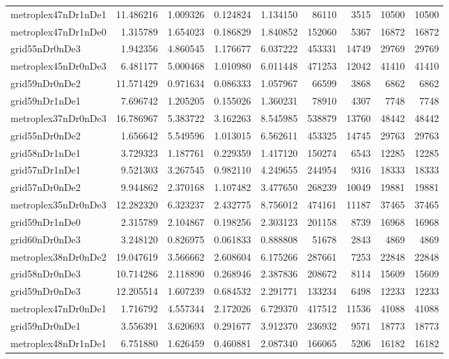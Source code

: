 \begin{longtable}{|l|r|r|r|r|r|r|r|r|}
metroplex47nDr1nDe1 & 11.486216 & 1.009326 & 0.124824 & 1.134150 & 86110 & 3515 & 10500 & 10500 \\
metroplex47nDr1nDe0 & 1.315789 & 1.654023 & 0.186829 & 1.840852 & 152060 & 5367 & 16872 & 16872 \\
grid55nDr0nDe3 & 1.942356 & 4.860545 & 1.176677 & 6.037222 & 453331 & 14749 & 29769 & 29769 \\
metroplex45nDr0nDe3 & 6.481177 & 5.000468 & 1.010980 & 6.011448 & 471253 & 12042 & 41410 & 41410 \\
grid59nDr0nDe2 & 11.571429 & 0.971634 & 0.086333 & 1.057967 & 66599 & 3868 & 6862 & 6862 \\
grid59nDr1nDe1 & 7.696742 & 1.205205 & 0.155026 & 1.360231 & 78910 & 4307 & 7748 & 7748 \\
metroplex37nDr0nDe3 & 16.786967 & 5.383722 & 3.162263 & 8.545985 & 538879 & 13760 & 48442 & 48442 \\
grid55nDr0nDe2 & 1.656642 & 5.549596 & 1.013015 & 6.562611 & 453325 & 14745 & 29763 & 29763 \\
grid58nDr1nDe1 & 3.729323 & 1.187761 & 0.229359 & 1.417120 & 150274 & 6543 & 12285 & 12285 \\
grid57nDr1nDe1 & 9.521303 & 3.267545 & 0.982110 & 4.249655 & 244954 & 9316 & 18333 & 18333 \\
grid57nDr0nDe2 & 9.944862 & 2.370168 & 1.107482 & 3.477650 & 268239 & 10049 & 19881 & 19881 \\
metroplex35nDr0nDe3 & 12.282320 & 6.323237 & 2.432775 & 8.756012 & 474161 & 11187 & 37465 & 37465 \\
grid59nDr1nDe0 & 2.315789 & 2.104867 & 0.198256 & 2.303123 & 201158 & 8739 & 16968 & 16968 \\
grid60nDr0nDe3 & 3.248120 & 0.826975 & 0.061833 & 0.888808 & 51678 & 2843 & 4869 & 4869 \\
metroplex38nDr0nDe2 & 19.047619 & 3.566662 & 2.608604 & 6.175266 & 287661 & 7253 & 22848 & 22848 \\
grid58nDr0nDe3 & 10.714286 & 2.118890 & 0.268946 & 2.387836 & 208672 & 8114 & 15609 & 15609 \\
grid59nDr0nDe3 & 12.205514 & 1.607239 & 0.684532 & 2.291771 & 133234 & 6498 & 12233 & 12233 \\
metroplex47nDr0nDe1 & 1.716792 & 4.557344 & 2.172026 & 6.729370 & 417512 & 11536 & 41088 & 41088 \\
grid59nDr0nDe1 & 3.556391 & 3.620693 & 0.291677 & 3.912370 & 236932 & 9571 & 18773 & 18773 \\
metroplex48nDr1nDe1 & 6.751880 & 1.626459 & 0.460881 & 2.087340 & 166065 & 5206 & 16182 & 16182 \\

\end{longtable}
